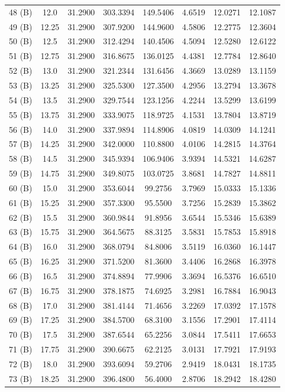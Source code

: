 \begin{landscape}
{\begin{longtable}{c|c|c|c|c|c|c|c}
48 (B)&12.0&31.2900&303.3394&149.5406&4.6519&12.0271&12.1087 \\
49 (B)&12.25&31.2900&307.9200&144.9600&4.5806&12.2775&12.3604 \\
50 (B)&12.5&31.2900&312.4294&140.4506&4.5094&12.5280&12.6122 \\
51 (B)&12.75&31.2900&316.8675&136.0125&4.4381&12.7784&12.8640 \\
52 (B)&13.0&31.2900&321.2344&131.6456&4.3669&13.0289&13.1159 \\
53 (B)&13.25&31.2900&325.5300&127.3500&4.2956&13.2794&13.3678 \\
54 (B)&13.5&31.2900&329.7544&123.1256&4.2244&13.5299&13.6199 \\
55 (B)&13.75&31.2900&333.9075&118.9725&4.1531&13.7804&13.8719 \\
56 (B)&14.0&31.2900&337.9894&114.8906&4.0819&14.0309&14.1241 \\
57 (B)&14.25&31.2900&342.0000&110.8800&4.0106&14.2815&14.3764 \\
58 (B)&14.5&31.2900&345.9394&106.9406&3.9394&14.5321&14.6287 \\
59 (B)&14.75&31.2900&349.8075&103.0725&3.8681&14.7827&14.8811 \\
60 (B)&15.0&31.2900&353.6044&99.2756&3.7969&15.0333&15.1336 \\
61 (B)&15.25&31.2900&357.3300&95.5500&3.7256&15.2839&15.3862 \\
62 (B)&15.5&31.2900&360.9844&91.8956&3.6544&15.5346&15.6389 \\
63 (B)&15.75&31.2900&364.5675&88.3125&3.5831&15.7853&15.8918 \\
64 (B)&16.0&31.2900&368.0794&84.8006&3.5119&16.0360&16.1447 \\
65 (B)&16.25&31.2900&371.5200&81.3600&3.4406&16.2868&16.3978 \\
66 (B)&16.5&31.2900&374.8894&77.9906&3.3694&16.5376&16.6510 \\
67 (B)&16.75&31.2900&378.1875&74.6925&3.2981&16.7884&16.9043 \\
68 (B)&17.0&31.2900&381.4144&71.4656&3.2269&17.0392&17.1578 \\
69 (B)&17.25&31.2900&384.5700&68.3100&3.1556&17.2901&17.4114 \\
70 (B)&17.5&31.2900&387.6544&65.2256&3.0844&17.5411&17.6653 \\
71 (B)&17.75&31.2900&390.6675&62.2125&3.0131&17.7921&17.9193 \\
72 (B)&18.0&31.2900&393.6094&59.2706&2.9419&18.0431&18.1735 \\
73 (B)&18.25&31.2900&396.4800&56.4000&2.8706&18.2942&18.4280 \\

\end{longtable}}
\end{landscape}
